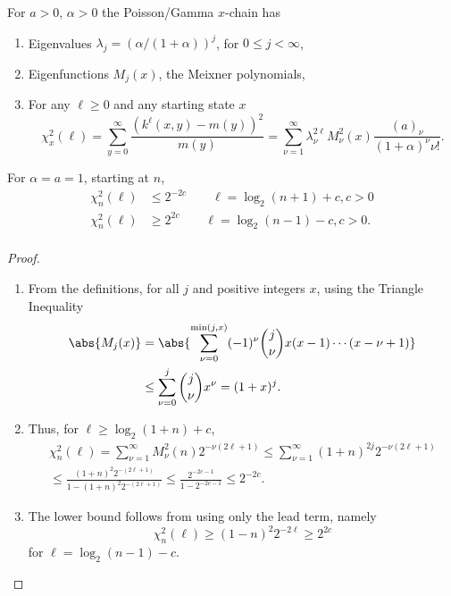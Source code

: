 \documentclass[12pt]{article}
\begin{document}
\begin{proposition}
    For \( a > 0 \), \( \alpha > 0 \) the Poisson/Gamma \( x \)-chain
    has
    \begin{enumerate}
        \item
            Eigenvalues \( \lambda_j = (\alpha/(1 + \alpha))^j \), for \(
            0 \le j < \infty \),
        \item
            Eigenfunctions \( M_j(x) \), the Meixner polynomials,
        \item
            For any \( \ell \ge 0 \) and any starting state \( x \)
            \[
                \chi_x^2(\ell) = \sum\limits_{y=0}^{\infty} \frac{(k^{\ell}
                (x,y) - m(y))^2}{m(y)} = \sum\limits_{\nu=1}^{\infty}
                \lambda_\nu^{2\ell} M_\nu^2(x) \frac{(a)_\nu}{(1 +
                \alpha)^\nu \nu!}.
            \]
    \end{enumerate}
\end{proposition}

\begin{corollary}
    \label{cor:spectralbounds:cutoff} For \( \alpha = a =1 \), starting
    at \( n \),
    \begin{align*}
        \chi_n^2(\ell) &\le 2^{-2c} \qquad \ell = \log_2(n+1) + c, c>0
        \\
        \chi_n^2(\ell) &\ge 2^{2c} \qquad \ell = \log_2(n-1) - c, c>0.
        \\
    \end{align*}
\end{corollary}

\begin{proof}
    \begin{enumerate}
        \item
            From the definitions, for all \( j \) and positive integers \(
            x \), using the Triangle Inequality
            \begin{align*}
                \abs{M_j(x)} &= \abs{ \sum\limits_{\nu=0}^{\min(j,x)} (-1)^\nu
                \binom{j}{\nu} x(x-1) \cdots (x-\nu+1)} \\
                &\le \sum\limits_{\nu=0}^j \binom{j}{\nu} x^\nu = (1 + x)^j.
            \end{align*}
        \item
            Thus, for \( \ell \ge \log_2(1 + n) + c \),
            \begin{multline*}
                \chi_n^2(\ell) = \sum\limits_{\nu=1}^{\infty} M_\nu^2(n)
                2^{-\nu(2\ell+1)} \le \sum\limits_{\nu=1}^{\infty} (1 +
                n)^{2j}2^{-\nu(2\ell+1)} \\
                \le \frac{(1+n)^2 2^{-(2\ell+1)}}{1 - (1 + n)^2 2^{-(2\ell+1)}}
                \le \frac{2^{-2c-1}}{1 - 2^{-2c-1}} \le 2^{-2c}.
            \end{multline*}
        \item
            The lower bound follows from using only the lead term,
            namely
            \[
                \chi_n^2(\ell) \ge (1-n)^2 2^{-2\ell} \ge 2^{2c}
            \] for \( \ell = \log_2(n-1) - c \).
    \end{enumerate}
\end{proof}
\end{document}

